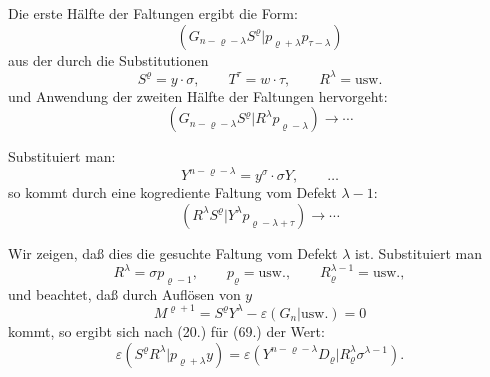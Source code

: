 \documentclass[12pt,a4paper]{article}
\begin{document}
Die erste Hälfte der Faltungen ergibt die Form:
\begin{equation*}
(G_{n-\varrho-\lambda} S^{\varrho} | p_{\varrho+\lambda} p_{\tau-\lambda})
\end{equation*}
aus der durch die Substitutionen
\begin{equation*}
S^{\varrho} = y \cdot \sigma, \qquad T^{\tau} = w \cdot \tau, \qquad R^{\lambda} = \text{usw.}
\end{equation*}
und Anwendung der zweiten Hälfte der Faltungen hervorgeht:
\begin{equation*}
(G_{n-\varrho-\lambda} S^{\varrho} | R^{\lambda} p_{\varrho-\lambda}) \to \cdots
\end{equation*}

Substituiert man:
\begin{equation*}
Y^{n-\varrho-\lambda} = y^{\sigma} \cdot \sigma Y, \qquad \ldots
\end{equation*}
so kommt durch eine kogrediente Faltung vom Defekt $\lambda-1$:
\begin{equation}\tag{69}
(R^{\lambda} S^{\varrho} | Y^{\lambda} p_{\varrho-\lambda+\tau}) \to \cdots
\end{equation}

Wir zeigen, daß dies die gesuchte Faltung vom Defekt $\lambda$ ist. Substituiert man
\begin{equation*}
R^{\lambda} = \sigma p_{\varrho-1}, \qquad p_{\varrho} = \text{usw.}, \qquad R^{\lambda-1}_{\varrho} = \text{usw.},
\end{equation*}
und beachtet, daß durch Auflösen von $y$
\begin{equation*}
M^{\varrho+1} = S^{\varrho} Y^{\lambda} - \varepsilon (G_{n} | \text{usw.}) = 0
\end{equation*}
kommt, so ergibt sich nach (20.) für (69.) der Wert:
\begin{equation*}
\varepsilon (S^{\varrho} R^{\lambda} | p_{\varrho+\lambda} y) = \varepsilon (Y^{n-\varrho-\lambda} D_{\varrho} | R^{\lambda}_{\varrho} \sigma^{\lambda-1}).
\end{equation*}
\end{document}
